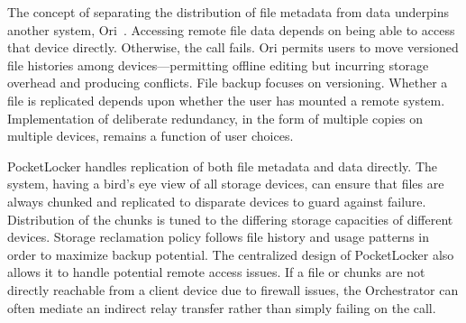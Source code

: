 The concept of separating the distribution of file metadata from data
underpins another system, Ori~\cite{mashtizadeh2013replication}.  Accessing
remote file data depends on being able to access that device directly.
Otherwise, the call fails.  Ori permits users to move versioned file histories
among devices---permitting offline editing but incurring storage overhead and
producing conflicts.  File backup
focuses on versioning.  Whether a file is replicated
depends upon whether the user has mounted a remote system.
Implementation of deliberate redundancy, in the form of multiple copies on
multiple devices, remains a function of user choices.  

PocketLocker handles replication of both
file metadata and data directly.  The system, having a bird's eye view of all
storage devices, can ensure that files are always chunked and replicated to
disparate devices to guard against failure.  Distribution of the chunks is
tuned to the differing storage capacities of different devices.  Storage
reclamation policy follows file history and usage patterns in order to
maximize backup potential.  The centralized design of PocketLocker also
allows it to handle potential remote access issues.  If a file or chunks are
not directly reachable from a client device due to firewall issues, the
Orchestrator can often mediate an indirect relay transfer rather than simply
failing on the call.

